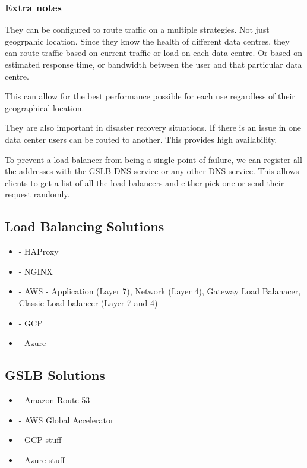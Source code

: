 \documentclass[a4paper, 11pt]{book}
\begin{document}
    \subsubsection{Extra notes}
    They can be configured to route traffic on a multiple strategies.
    Not just geogrpahic location.
    Since they know the health of different data centres, they can route traffic based on current traffic or load on each data centre.
    Or based on estimated response time, or bandwidth between the user and that particular data centre.

    This can allow for the best performance possible for each use regardless of their geographical location.

    They are also important in disaster recovery situations.
    If there is an issue in one data center users can be routed to another.
    This provides high availability.

    To prevent a load balancer from being a single point of failure, we can register all the addresses with the GSLB DNS service or any other DNS service.
    This allows clients to get a list of all the load balancers and either pick one or send their request randomly.

    \subsection{Load Balancing Solutions}
    \begin{itemize}
        \item - HAProxy
        \item - NGINX
        \item - AWS - Application (Layer 7), Network (Layer 4), Gateway Load Balanacer, Classic Load balancer (Layer 7 and 4)
        \item - GCP %
        \item - Azure %
    \end{itemize}

    \subsection{GSLB Solutions}
    \begin{itemize}
        \item - Amazon Route 53
        \item - AWS Global Accelerator
        \item - GCP stuff
        \item - Azure stuff
    \end{itemize}
\end{document}
